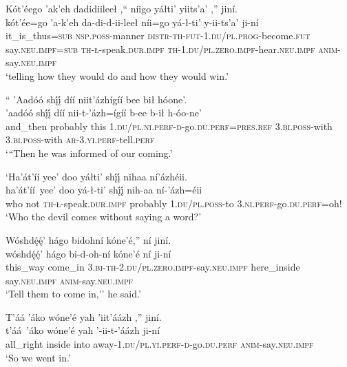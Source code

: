 \ea\label{ex:text2-18-4}
Kót’éego ’ak’eh dadidiileeł ,`` níigo yáłti’ yiits’a’ ,'' jiní.\\
\gll kót’ée=go	’a-k’eh	da-di-d-ii-leeł	níi=go	yá-ł-ti’	y-ii-ts’a’	ji-ní\\
     it\_is\_thus=\textsc{sub}	\textsc{nsp}.\textsc{poss}-manner	\textsc{distr}-\textsc{th}-\textsc{fut}-1.\textsc{du}/\textsc{pl}.\textsc{prog}-become.\textsc{fut}	say.\textsc{neu}.\textsc{impf}=\textsc{sub}	\textsc{th}-\textsc{ł}-speak.\textsc{dur}.\textsc{impf}	\textsc{th}-1.\textsc{du}/\textsc{pl}.\textsc{zero}.\textsc{impf}-hear.\textsc{neu}.\textsc{impf}	\textsc{anim}-say.\textsc{neu}.\textsc{impf}\\
\glt `telling how they would do and how they would win.'
\z

\ea\label{ex:text2-19-1}
`` ’Aadóó shį́į́ díí niit’ázhígíí bee bił hóone’.\\
\gll ’aadóó	shį́į́	díí	nii-t-’ázh=ígíí	b-ee	b-ił	h-óo-ne’\\
     and\_then	probably	this	1.\textsc{du}/\textsc{pl}.\textsc{ni}.\textsc{perf}-\textsc{d}-go.\textsc{du}.\textsc{perf}=\textsc{pres}.\textsc{ref}	3.\textsc{bi}.\textsc{poss}-with	3.\textsc{bi}.\textsc{poss}-with	\textsc{ar}-3.\textsc{yi}.\textsc{perf}-tell.\textsc{perf}\\
\glt `{``}Then he was informed of our coming.'
\z

\ea\label{ex:text2-19-2}
`Ha’át’íí yee’ doo yáłti’ shį́į́ nihaa ní’ázhéii.\\
\gll ha’át’íí~{yee’}	doo	yá-ł-ti’	shį́į́	nih-aa	ní-’ázh=éii\\
     who	not	\textsc{th}-\textsc{ł}-speak.\textsc{dur}.\textsc{impf}	probably	1.\textsc{du}/\textsc{pl}.\textsc{poss}-to	3.\textsc{ni}.\textsc{perf}-go.\textsc{du}.\textsc{perf}=oh!\\
\glt `Who the devil comes without saying a word?'
\z

\ea\label{ex:text2-19-3}
Wóshdę́ę́’ hágo bidohní kóne’é,'' ní jiní.\\
\gll wóshdę́ę́’	hágo	bi-d-oh-ní	kóne’é	ní	ji-ní\\
     this\_way	come\_in	3.\textsc{bi}-\textsc{th}-2.\textsc{du}/\textsc{pl}.\textsc{zero}.\textsc{impf}-say.\textsc{neu}.\textsc{impf}	here\_inside	say.\textsc{neu}.\textsc{impf}	\textsc{anim}-say.\textsc{neu}.\textsc{impf}\\
\glt `Tell them to come in,'' he said.'
\z

\ea\label{ex:text2-19-4}
T’áá ’áko wóne’é yah ’iit’áázh ,'' jiní.\\
\gll t’áá~{’áko}	wóne’é	yah	’-ii-t-’áázh	ji-ní\\
     all\_right	inside	into	away-1.\textsc{du}/\textsc{pl}.\textsc{yi}.\textsc{perf}-\textsc{d}-go.\textsc{du}.\textsc{perf}	\textsc{anim}-say.\textsc{neu}.\textsc{impf}\\
\glt `So we went in.'
\z

